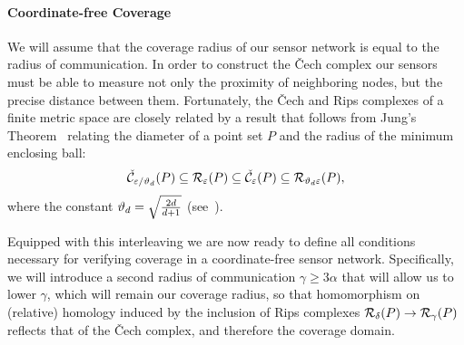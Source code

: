 \paragraph{Coordinate-free Coverage}
We will assume that the coverage radius of our sensor network is equal to the radius of communication.
In order to construct the \v Cech complex our sensors must be able to measure not only the proximity of neighboring nodes, but the precise distance between them.
Fortunately, the \v Cech and Rips complexes of a finite metric space are closely related by a result that follows from Jung's Theorem~\cite{jung01uber} relating the diameter of a point set $P$ and the radius of the minimum enclosing ball:
\begin{equation}\label{eq:jung_inclusion}
  \check{\mathcal{C}}_{\varepsilon/\vartheta_d}(P)\subseteq\mathcal{R}_\varepsilon(P)\subseteq\check{\mathcal{C}}_\varepsilon(P)\subseteq\mathcal{R}_{\vartheta_d\varepsilon}(P),
\end{equation}
where the constant $\vartheta_d = \sqrt{\frac{2d}{d+1}}$ (see~\cite{buchet15efficient}).

Equipped with this interleaving we are now ready to define all conditions necessary for verifying coverage in a coordinate-free sensor network.
Specifically, we will introduce a second radius of communication $\gamma\geq 3\alpha$ that will allow us to lower $\gamma$, which will remain our coverage radius, so that homomorphism on (relative) homology induced by the inclusion of Rips complexes $\mathcal{R}_\delta(P)\to\mathcal{R}_\gamma(P)$ reflects that of the \v Cech complex, and therefore the coverage domain.

%
%


